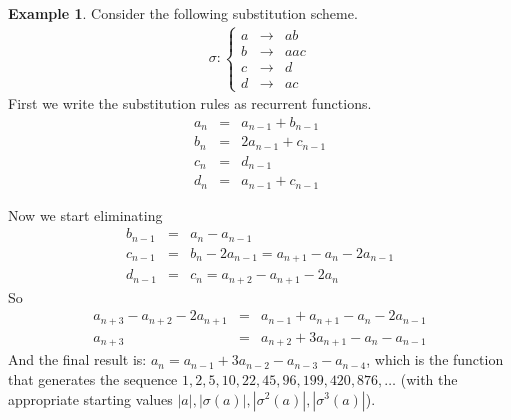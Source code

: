 \documentclass{article}
\theoremstyle{definition}
\newtheorem{example}[theorem]{Example}
\begin{document}
\begin{example}
Consider the following substitution scheme.
\begin{eqnarray*}
\sigma: \left\{ \begin{array}{lll}
a &\rightarrow& ab\\
b &\rightarrow& aac\\
c &\rightarrow& d\\
d &\rightarrow& ac
\end{array} \right.
\end{eqnarray*}
First we write the substitution rules as recurrent functions.
\begin{eqnarray*}
a_n &=& a_{n - 1} + b_{n - 1}\\
b_n &=& 2a_{n - 1} + c_{n - 1}\\
c_n &=& d_{n - 1}\\
d_n &=& a_{n - 1} + c_{n - 1}
\end{eqnarray*}

Now we start eliminating 
\begin{eqnarray*}
b_{n - 1} &=& a_n - a_{n - 1}\\
c_{n - 1} &=& b_n - 2a_{n - 1} = a_{n + 1} - a_n - 2a_{n - 1}\\
d_{n - 1} &=& c_n = a_{n + 2} - a_{n + 1} - 2a_n
\end{eqnarray*}
So
\begin{eqnarray*}
a_{n + 3} - a_{n + 2} - 2a_{n + 1} &=& 
  a_{n - 1} + a_{n + 1} - a_n - 2a_{n - 1}\\
a_{n + 3} &=& a_{n + 2} + 3a_{n + 1} - a_n - a_{n - 1}
\end{eqnarray*}
And the final result is:
$a_n = a_{n - 1} + 3a_{n - 2} - a_{n - 3} - a_{n - 4}$, which is the function
that generates the sequence $1, 2, 5, 10, 22, 45, 96, 199, 420, 876, \ldots$
(with the appropriate starting values 
$|a|, |\sigma(a)|, |\sigma^2(a)|, |\sigma^3(a)|$).
\end{example}
\end{document}
